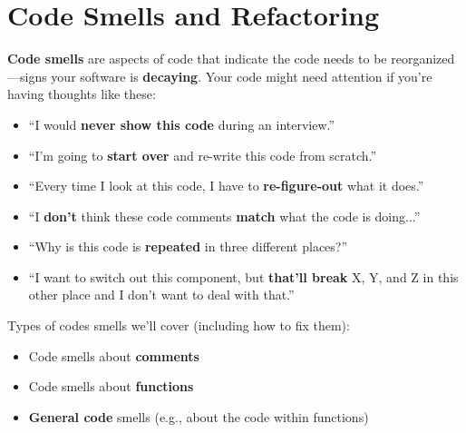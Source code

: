 \yesmargins

\chapter{Code Smells and Refactoring}


\textbf{Code smells} are aspects of code that indicate the code needs to be reorganized---signs your software is \textbf{decaying}\marginpar{\codeSmellDef\margindivider}\marginpar{\codeDecayDef}. Your code might need attention if you're having thoughts like these:

\begin{itemize}
\item ``I would \textbf{never show this code} during an interview.''
\item ``I'm going to \textbf{start over} and re-write this code from scratch.''
\item ``Every time I look at this code, I have to \textbf{re-figure-out} what it does.''
\item ``I \textbf{don't} think these code comments \textbf{match} what the code is doing...''
\item ``Why is this code is \textbf{repeated} in three different places?''
\item ``I want to switch out this component, but \textbf{that'll break} X, Y, and Z in this other place and I don't want to deal with that.''
\end{itemize}

Types of codes smells we'll cover (including how to fix them):\\

\begin{itemize}
\item Code smells about \textbf{comments}
\item Code smells about \textbf{functions}
\item \textbf{General code} smells (e.g., about the code within functions)\\
\end{itemize}


